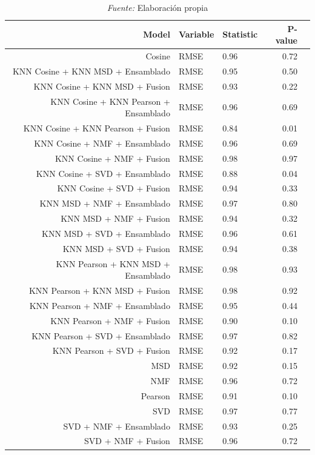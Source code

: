 \begin{table}[H]
\caption{Resultados de la prueba de Shapiro-Wilk a los modelos producidos por las diferentes técnicas de ensamblado}
    \centering
    \begin{tabular}{rllrr}
    \hline
        \textbf{Model} & \textbf{Variable} & \textbf{Statistic} & \textbf{P-value} \\ \hline
        Cosine & RMSE & 0.96 & 0.72 \\ \hline
        KNN Cosine + KNN MSD + Ensamblado & RMSE & 0.95 & 0.50 \\ \hline
        KNN Cosine + KNN MSD + Fusion & RMSE & 0.93 & 0.22 \\ \hline
        KNN Cosine + KNN Pearson + Ensamblado & RMSE & 0.96 & 0.69 \\ \hline
        KNN Cosine + KNN Pearson + Fusion & RMSE & 0.84 & 0.01 \\ \hline
        KNN Cosine + NMF + Ensamblado & RMSE & 0.96 & 0.69 \\ \hline
        KNN Cosine + NMF + Fusion & RMSE & 0.98 & 0.97 \\ \hline
        KNN Cosine + SVD + Ensamblado & RMSE & 0.88 & 0.04 \\ \hline
        KNN Cosine + SVD + Fusion & RMSE & 0.94 & 0.33 \\ \hline
        KNN MSD + NMF + Ensamblado & RMSE & 0.97 & 0.80 \\ \hline
        KNN MSD + NMF + Fusion & RMSE & 0.94 & 0.32 \\ \hline
        KNN MSD + SVD + Ensamblado & RMSE & 0.96 & 0.61 \\ \hline
        KNN MSD + SVD + Fusion & RMSE & 0.94 & 0.38 \\ \hline
        KNN Pearson + KNN MSD + Ensamblado & RMSE & 0.98 & 0.93 \\ \hline
        KNN Pearson + KNN MSD + Fusion & RMSE & 0.98 & 0.92 \\ \hline
        KNN Pearson + NMF + Ensamblado & RMSE & 0.95 & 0.44 \\ \hline
        KNN Pearson + NMF + Fusion & RMSE & 0.90 & 0.10 \\ \hline
        KNN Pearson + SVD + Ensamblado & RMSE & 0.97 & 0.82 \\ \hline
        KNN Pearson + SVD + Fusion & RMSE & 0.92 & 0.17 \\ \hline
        MSD & RMSE & 0.92 & 0.15 \\ \hline
        NMF & RMSE & 0.96 & 0.72 \\ \hline
        Pearson & RMSE & 0.91 & 0.10 \\ \hline
        SVD & RMSE & 0.97 & 0.77 \\ \hline
        SVD + NMF + Ensamblado & RMSE & 0.93 & 0.25 \\ \hline
        SVD + NMF + Fusion & RMSE & 0.96 & 0.72 \\ \hline
    \end{tabular}
\label{tab:shapiro_test_results_hp2}
\caption*{\small\textit{Fuente:} Elaboración propia}
\end{table}

